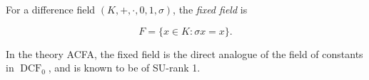 For a difference field $(K, +, \cdot, 0, 1, \sigma)$, the \textit{fixed field} is

$$F = \{x \in K : \sigma x = x\}.$$

In the theory ACFA, the fixed field is the direct analogue of the field of constants in $\operatorname{DCF}_0$, and is known to be of SU-rank 1.
